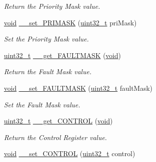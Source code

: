 \begin{DoxyCompactItemize}
\begin{DoxyCompactList}\small\item\em Return the Priority Mask value. \end{DoxyCompactList}\item 
\hyperlink{group___n_a_m_e_ga18028b8badbf1ea7e704ccac3c488e82}{void} \hyperlink{group___c_m_s_i_s___c_m3__core__definitions_ga70b4e1a6c1c86eb913fb9d6e8400156f}{\-\_\-\-\_\-set\-\_\-\-P\-R\-I\-M\-A\-S\-K} (\hyperlink{stdint_8h_a435d1572bf3f880d55459d9805097f62}{uint32\-\_\-t} pri\-Mask)
\begin{DoxyCompactList}\small\item\em Set the Priority Mask value. \end{DoxyCompactList}\item 
\hyperlink{stdint_8h_a435d1572bf3f880d55459d9805097f62}{uint32\-\_\-t} \hyperlink{group___c_m_s_i_s___c_m3__core__definitions_gaa78e4e6bf619a65e9f01b4af13fed3a8}{\-\_\-\-\_\-get\-\_\-\-F\-A\-U\-L\-T\-M\-A\-S\-K} (\hyperlink{group___n_a_m_e_ga18028b8badbf1ea7e704ccac3c488e82}{void})
\begin{DoxyCompactList}\small\item\em Return the Fault Mask value. \end{DoxyCompactList}\item 
\hyperlink{group___n_a_m_e_ga18028b8badbf1ea7e704ccac3c488e82}{void} \hyperlink{group___c_m_s_i_s___c_m3__core__definitions_gaa5587cc09031053a40a35c14ec36078a}{\-\_\-\-\_\-set\-\_\-\-F\-A\-U\-L\-T\-M\-A\-S\-K} (\hyperlink{stdint_8h_a435d1572bf3f880d55459d9805097f62}{uint32\-\_\-t} fault\-Mask)
\begin{DoxyCompactList}\small\item\em Set the Fault Mask value. \end{DoxyCompactList}\item 
\hyperlink{stdint_8h_a435d1572bf3f880d55459d9805097f62}{uint32\-\_\-t} \hyperlink{group___c_m_s_i_s___c_m3__core__definitions_ga963cf236b73219ce78e965deb01b81a7}{\-\_\-\-\_\-get\-\_\-\-C\-O\-N\-T\-R\-O\-L} (\hyperlink{group___n_a_m_e_ga18028b8badbf1ea7e704ccac3c488e82}{void})
\begin{DoxyCompactList}\small\item\em Return the Control Register value. \end{DoxyCompactList}\item 
\hyperlink{group___n_a_m_e_ga18028b8badbf1ea7e704ccac3c488e82}{void} \hyperlink{group___c_m_s_i_s___c_m3__core__definitions_gac64d37e7ff9de06437f9fb94bbab8b6c}{\-\_\-\-\_\-set\-\_\-\-C\-O\-N\-T\-R\-O\-L} (\hyperlink{stdint_8h_a435d1572bf3f880d55459d9805097f62}{uint32\-\_\-t} control)

\end{DoxyCompactItemize}
